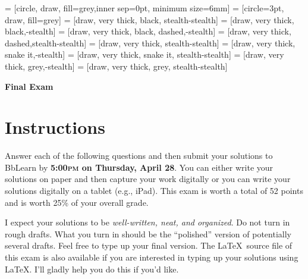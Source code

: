\documentclass[11pt]{article}
\theoremstyle{definition}
\begin{document}
 = [circle, draw, fill=grey,inner sep=0pt, minimum size=6mm]
 = [circle=3pt, draw, fill=grey]
 = [draw, very  thick, black, stealth-stealth]
 = [draw, very  thick, black,-stealth]
 = [draw, very  thick, black, dashed,-stealth]
 = [draw, very thick, dashed,stealth-stealth]
 = [draw, very thick, stealth-stealth]
 = [draw, very thick, snake it,-stealth]
 = [draw, very thick, snake it, stealth-stealth]
 = [draw, very thick, grey,-stealth]
 = [draw, very thick, grey, stealth-stealth]

\begin{center}

{\Large\bf Final Exam}

\bigskip

  
  \bigskip
  

\end{center}

\section*{Instructions}

Answer each of the following questions and then submit your solutions to BbLearn by \textbf{5:00\textsc{pm} on Thursday, April 28}. You can either write your solutions on paper and then capture your work digitally or you can write your solutions digitally on a tablet (e.g., iPad). This exam is worth a total of 52 points and is worth 25\% of your overall grade.

\bigskip

I expect your solutions to be \emph{well-written, neat, and organized}.  Do not turn in rough drafts.  What you turn in should be the ``polished'' version of potentially several drafts.  Feel free to type up your final version.  The \LaTeX\ source file of this exam is also available if you are interested in typing up your solutions using \LaTeX.  I'll gladly help you do this if you'd like.
\end{document}
